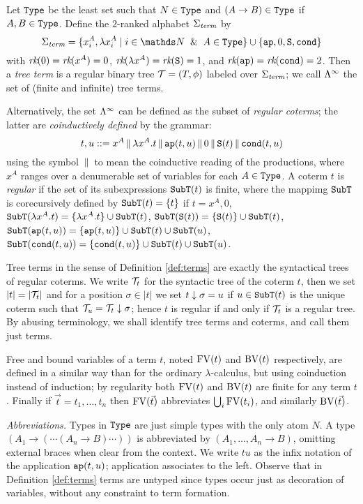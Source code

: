 \begin{definition}\label{def:terms}
Let ${\tt Type}$ be the least
set such that $N \in {\tt Type}$ and $(A \to B) \in {\tt Type}$ if $A,B \in {\tt Type}$.
Define the $2$-ranked alphabet $\Sigma_{\textit{term}}$ by
\[\SigmaTerm = \set{x_i^A, \lambda x_i^A \mid i \in \nat \And A\in \Type} \cup \set{\ap, 0, \Succ, \cond}\]
with $\textit{rk}(0) = \textit{rk}(x^A) = 0$, $\textit{rk}( \lambda x^A) = \textit{rk}({\tt S}) = 1$, and
$\textit{rk}({\tt ap}) = \textit{rk}({\tt cond}) = 2$.
Then a {\em tree term} is a regular binary tree $\BTree = (T, \phi)$ labeled over $\Sigma_{\textit{term}}$; we
call $\Lambda^\infty$ the set of (finite and infinite) tree terms.
\end{definition}

\medskip

Alternatively, the set $\Lambda^\infty$ can be defined as the subset of {\em regular coterms}; the latter are
{\em coinductively defined} by the grammar:
\[ t, u ::= x^A \,\|\, \lambda x^A.t \,\|\, {\tt ap}(t,u) \,\|\, 0 \,\|\, {\tt S} (t) \,\|\, {\tt cond}(t, u) \]
using the symbol $\,\|\,$ to mean the coinductive reading of the productions,
where $x^A$ ranges over a denumerable set of variables for each $A \in {\tt Type}$.
A coterm $t$ is {\em regular} if the set of its subexpressions ${\tt SubT}(t)$ is finite,
where the mappimg ${\tt SubT}$ is corecursively defined by ${\tt SubT}(t) = \{ t \}$ if $t = x^A, 0$, 
${\tt SubT}(\lambda x^A.t) = \{ \lambda x^A.t \} \cup {\tt SubT}(t)$, 
${\tt SubT}({\tt S}(t)) = \{ {\tt S}(t) \} \cup {\tt SubT}(t)$,
${\tt SubT}({\tt ap}(t,u)) = \{ {\tt ap}(t,u) \} \cup {\tt SubT}(t) \cup {\tt SubT}(u)$,
${\tt SubT}({\tt cond}(t,u)) = \{ {\tt cond}(t,u) \} \cup {\tt SubT}(t) \cup {\tt SubT}(u)$.

Tree terms in the sense of Definition \ref{def:terms} are exactly the syntactical trees of regular coterms. 
We write $\BTree_t$ for the syntactic tree of the coterm $t$, then we set $|t| = |\BTree_t|$ and for
a position $\sigma \in |t|$ we set $t \downarrow \sigma = u$ if $u \in {\tt SubT}(t)$ is the unique 
coterm such that $\BTree_u = \SubTree{\BTree_t}{\sigma}$; hence $t$ is regular if and only if $\BTree_t$
is a regular tree. By abusing terminology, we shall 
identify tree terms and coterms, and call them just terms.

Free and bound variables of a term $t$, noted ${{\rm FV}}(t)$ and ${{\rm BV}}(t)$ respectively, are defined in a similar 
way than for the ordinary $\lambda$-calculus, but using coinduction instead of induction; by regularity both 
${{\rm FV}}(t)$ and ${{\rm BV}}(t)$ are finite for any term $t$. Finally if $\vec{t} = t_1, \ldots , t_n$ then ${{\rm FV}}(\vec{t})$ abbreviates
$\bigcup_i {{\rm FV}}(t_i)$, and similarly ${{\rm BV}}(\vec{t})$.

\medskip
{\em Abbreviations.} Types in ${\tt Type}$ are just simple types with the only atom $N$.
A type $(A_1 \to (\cdots (A_n \to B) \cdots))$ is abbreviated by $(A_1, \ldots, A_n \to B)$,
omitting external braces when clear from the context.
We write $tu$ as the infix notation of the application ${\tt ap}(t,u)$; application associates to the left.
Observe that in Definition \ref{def:terms} terms are untyped since types occur just as decoration of variables, without any constraint
to term formation.

